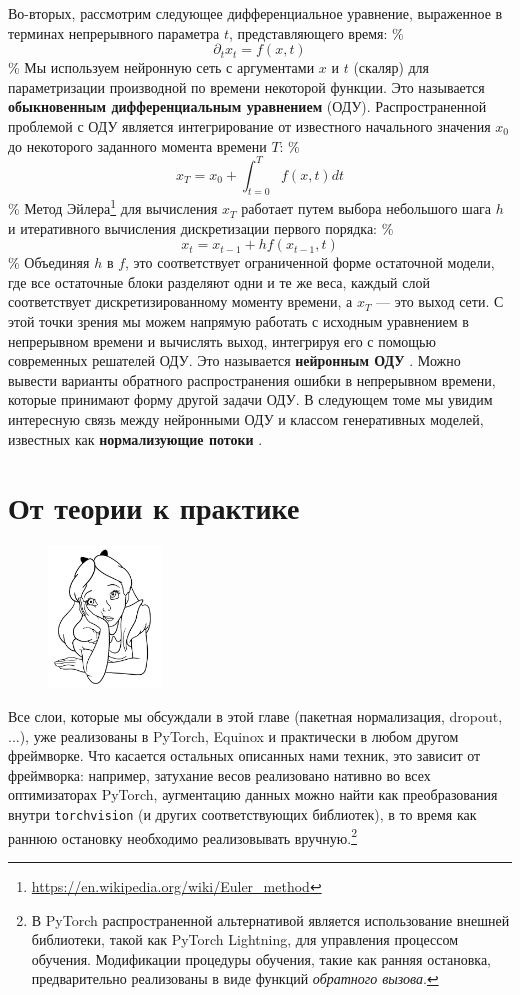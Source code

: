 Во-вторых, рассмотрим следующее дифференциальное уравнение, выраженное в терминах непрерывного параметра $t$, представляющего время:
\%
$$
\partial_tx_t=f(x,t)
$$
\%
Мы используем нейронную сеть с аргументами $x$ и $t$ (скаляр) для параметризации производной по времени некоторой функции. Это называется \textbf{обыкновенным дифференциальным уравнением} (ОДУ). Распространенной проблемой с ОДУ является интегрирование от известного начального значения $x_0$ до некоторого заданного момента времени $T$:
\%
$$
x_T=x_0+\int_{t=0}^Tf(x,t)dt
$$
\%
Метод Эйлера\footnote{\url{https://en.wikipedia.org/wiki/Euler_method}} для вычисления $x_T$ работает путем выбора небольшого шага $h$ и итеративного вычисления дискретизации первого порядка:
\%
$$
x_t=x_{t-1}+hf(x_{t-1}, t)
$$
\%
Объединяя $h$ в $f$, это соответствует ограниченной форме остаточной модели, где все остаточные блоки разделяют одни и те же веса, каждый слой соответствует дискретизированному моменту времени, а $x_T$ — это выход сети. С этой точки зрения мы можем напрямую работать с исходным уравнением в непрерывном времени и вычислять выход, интегрируя его с помощью современных решателей ОДУ. Это называется \textbf{нейронным ОДУ} \cite{chen2018neural}. Можно вывести варианты обратного распространения ошибки в непрерывном времени, которые принимают форму другой задачи ОДУ. В следующем томе мы увидим интересную связь между нейронными ОДУ и классом генеративных моделей, известных как \textbf{нормализующие потоки} \cite{papamakarios2021normalizing}.

\section*{От теории к практике}

\begin{figure}
\vspace{-3em}\includegraphics[width=3.0cm]{images/shutterstock_2075221579.jpg}
\vspace{-2em}
\end{figure}

Все слои, которые мы обсуждали в этой главе (пакетная нормализация, dropout, ...), уже реализованы в PyTorch, Equinox и практически в любом другом фреймворке. Что касается остальных описанных нами техник, это зависит от фреймворка: например, затухание весов реализовано нативно во всех оптимизаторах PyTorch, аугментацию данных можно найти как преобразования внутри \texttt{torchvision} (и других соответствующих библиотек), в то время как раннюю остановку необходимо реализовывать вручную.\footnote{В PyTorch распространенной альтернативой является использование внешней библиотеки, такой как PyTorch Lightning, для управления процессом обучения. Модификации процедуры обучения, такие как ранняя остановка, предварительно реализованы в виде функций \textit{обратного вызова}.}

